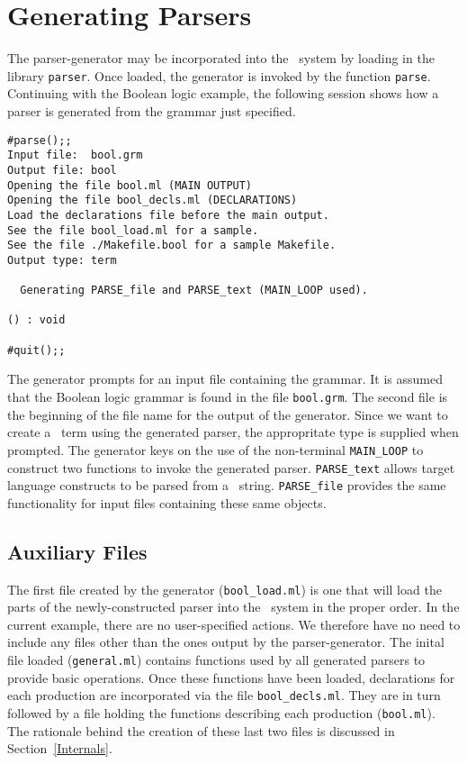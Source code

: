\section{Generating Parsers}

The parser-generator may be incorporated into the \HOL\ system by loading 
in the library \verb"parser".
Once loaded, the generator is invoked by the function
\verb"parse".  Continuing with the Boolean logic
example, the following
session shows how a parser is generated from the grammar just specified.
\setcounter{sessioncount}{1}
\small
\begin{center}
\begin{session}
\begin{verbatim}
#parse();;
Input file:  bool.grm
Output file: bool 
Opening the file bool.ml (MAIN OUTPUT) 
Opening the file bool_decls.ml (DECLARATIONS) 
Load the declarations file before the main output. 
See the file bool_load.ml for a sample. 
See the file ./Makefile.bool for a sample Makefile. 
Output type: term 

  Generating PARSE_file and PARSE_text (MAIN_LOOP used). 

() : void 

#quit();; 
\end{verbatim}
\end{session}
\end{center}
\normalsize
The generator prompts for an input file containing the grammar.  It is
assumed that the Boolean logic grammar is found in the file 
\verb"bool.grm".  The second file is the beginning of the file name for
the output of the generator.  Since we want to create a \HOL\ term using
the generated parser, the appropritate type is supplied when prompted.
The generator keys on the use of the non-terminal 
\verb"MAIN_LOOP" to
construct
two functions to invoke the generated parser.  
\verb"PARSE_text" allows 
target language constructs to be parsed from a \ML\ string.
\verb"PARSE_file" provides the same 
functionality for input files containing these same objects.

\subsection {Auxiliary Files}

The first file created by the generator (\verb"bool_load.ml") 
is one that will load the parts of the
newly-constructed parser into the \HOL\ system in the proper order.
In the current
example, there are no user-specified actions.  We therefore have no need
to include any files other than the ones output by the parser-generator.
The inital file loaded (\verb"general.ml") contains 
functions used by all generated parsers to provide basic operations. 
Once these functions have been loaded,
declarations for each production are incorporated via the file
{\tt bool\_decls.ml}.  They are in turn followed by a file holding the 
functions describing each production ({\tt bool.ml}).  
The rationale behind the creation of these last two files is discussed in 
Section~\ref{Internals}.


